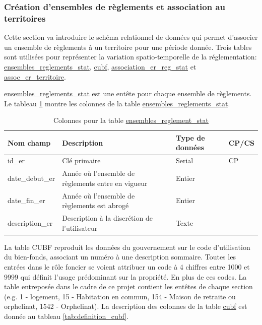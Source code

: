     \subsubsection{Création d'ensembles de règlements et association au territoires} \label{sec:ensembles_association}
    Cette section va introduire le schéma relationnel de données qui permet d'associer un ensemble de règlements à un territoire pour une période donnée. Trois tables sont utilisées pour représenter la variation spatio-temporelle de la réglementation: \underline{ensembles\_reglements\_stat}, \underline{cubf}, \underline{association\_er\_reg\_stat} et \underline{assoc\_er\_territoire}.\par
    \underline{ensembles\_reglements\_stat} est une entête pour chaque ensemble de règlements. Le tableau \ref{tab:definition_er} montre les colonnes de la table \underline{ensembles\_reglements\_stat}. \par
    \begin{table}[h]
       \centering
       \begin{tabular}{m{}|m{}m{}m{}}
            \hline
            Nom champ & Description & Type de données & CP/CS  \\
            \hline
            id\_er & Clé primaire  & Serial & CP \\  
            date\_debut\_er & Année où l'ensemble de règlements entre en vigueur & Entier & \\
            date\_fin\_er & Année où l'ensemble de règlements est abrogé& Entier & \\
            description\_er & Description à la discrétion de l'utilisateur & Texte & \\
            \hline
       \end{tabular}
       \caption{Colonnes pour la table \underline{ensembles\_reglement\_stat}}
       \label{tab:definition_er}
   \end{table}   
   La table \ac{CUBF} reproduit les données du gouvernement sur le code d'utilisation du bien-fonds, associant un numéro à une description sommaire. Toutes les entrées dans le rôle foncier se voient attribuer un code à 4 chiffres entre 1000 et 9999 qui définit l'usage prédominant sur la propriété. En plus de ces codes. La table entreposée dans le cadre de ce projet contient les entêtes de chaque section (e.g. 1 - logement, 15 - Habitation en commun, 154 - Maison de retraite ou orphelinat, 1542 - Orphelinat). La description des colonnes de la table \underline{cubf} est donnée au tableau \ref{tab:definition_cubf}. \par
